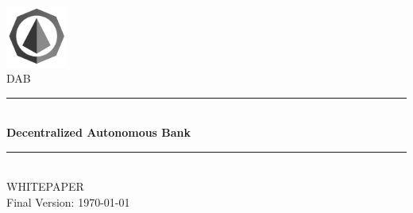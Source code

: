 \documentclass[review]{elsarticle}
\newcommand{\HRule}{\rule{\linewidth}{0.5mm}}
\begin{document}
\begin{titlepage}
\begin{center}

\includegraphics[width=0.15\textwidth]{Graphs/logo3.jpg}\\[0.6cm]
\textsc{\huge DAB}\\[1cm]

\HRule \\[0.75cm]
{ \huge \bfseries Decentralized Autonomous Bank}\\[0.4cm]
\HRule \\[1.5cm]
\textsc{\LARGE WHITEPAPER}\\[0.5cm]

\vfill
{\large Final Version: \today}

\end{center}
\end{titlepage}
\end{document}
